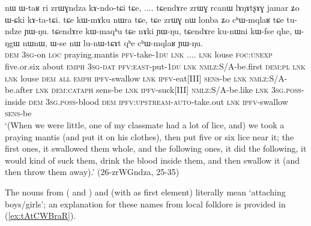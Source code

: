 \begin{exe}
\ex \label{ex:zrWGndza}
\gll nɯ ɯ-taʁ ri zrɯɣndza kɤ-ndo-tɕi tɕe, .... tɕendɤre zrɯɣ rcanɯ lɤŋɤtʂɤɣ jamar ʑo ɯ-ɕki kɤ-ta-tɕi. tɕe kɯ-mɤku nɯra tɕe, tɕe zrɯɣ nɯ lonba ʑo cʰɯ-mqlaʁ tɕe tu-ndze ɲɯ-ŋu. tɕendɤre kɯ-maqʰu tɕe nɤki ɲɯ-ŋu,  tɕendɤre ku-nɯni kɯ-fse qhe, ɯ-ŋgɯ nɯnɯ,  ɯ-se nɯ lu-nɯ-tɕɤt qʰe cʰɯ-mqlaʁ ɲɯ-ŋu. \\
\textsc{dem} \textsc{3sg}-on \textsc{loc} praying.mantis \textsc{pfv}-take-\textsc{1du} \textsc{lnk} .... \textsc{lnk} louse \textsc{foc}:\textsc{unexp} five.or.six about \textsc{emph} \textsc{3sg}-\textsc{dat} \textsc{pfv}:\textsc{east}-put-\textsc{1du} \textsc{lnk} \textsc{nmlz}:S/A-be.first \textsc{dem:pl} \textsc{lnk} \textsc{lnk} louse \textsc{dem} \textsc{all} \textsc{emph} \textsc{ipfv}-swallow \textsc{lnk} \textsc{ipfv}-eat[III] \textsc{sens}-be \textsc{lnk} \textsc{nmlz}:S/A-be.after \textsc{lnk} \textsc{dem}:\textsc{cataph} sens-be \textsc{lnk} \textsc{ipfv}-suck[III] \textsc{nmlz}:S/A-be.like \textsc{lnk} \textsc{3sg.poss}-inside \textsc{dem} \textsc{3sg.poss}-blood \textsc{dem} \textsc{ipfv}:\textsc{upstream}-\textsc{auto}-take.out \textsc{lnk}  \textsc{ipfv}-swallow \textsc{sens}-be \\
\glt `(When we were little, one of my classmate had a lot of lice, and) we took a praying mantis (and put it on his clothes), then put five or six lice near it; the first ones, it swallowed them whole, and the following ones,  it did the following, it would kind of suck them, drink the blood inside them, and then swallow it (and then throw them away).' (26-zrWGndza, 25-35)
\end{exe}

The nouns  from ( and ) and   (with  as first element) literally mean `attaching boys/girls'; an explanation for these names from local folklore is provided in (\ref{ex:tAtCWBraR}).

